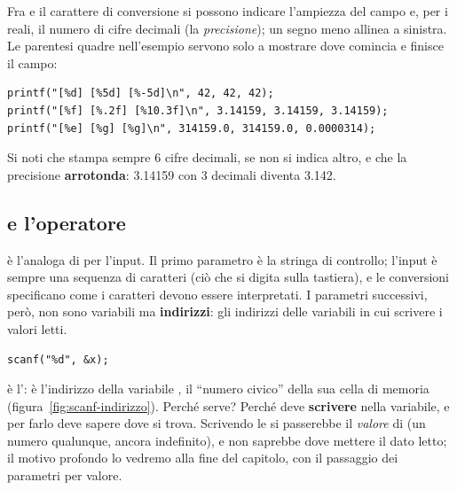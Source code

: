 Fra \code{\%} e il carattere di conversione si possono indicare l'ampiezza
del campo e, per i reali, il numero di cifre decimali (la
\textit{precisione}); un segno meno allinea a sinistra. Le parentesi quadre
nell'esempio servono solo a mostrare dove comincia e finisce il campo:

\begin{affianco}[0.55][c]
\begin{lstlisting}[style=c]
printf("[%d] [%5d] [%-5d]\n", 42, 42, 42);
printf("[%f] [%.2f] [%10.3f]\n", 3.14159, 3.14159, 3.14159);
printf("[%e] [%g] [%g]\n", 314159.0, 314159.0, 0.0000314);
\end{lstlisting}
\risultato
\begin{console}[Terminale]
[42] [   42] [42   ]
[3.141590] [3.14] [     3.142]
[3.141590e+05] [314159] [3.14e-05]
\end{console}
\end{affianco}

Si noti che  stampa sempre 6 cifre decimali, se non si indica
altro, e che la precisione \textbf{arrotonda}: 3.14159 con 3 decimali
diventa 3.142.

\subsection{ e l'operatore \code{\&}}

 è l'analoga di  per l'input. Il primo parametro è
la stringa di controllo; l'input è sempre una sequenza di caratteri (ciò che
si digita sulla tastiera), e le conversioni specificano come i caratteri
devono essere interpretati. I parametri successivi, però, non sono variabili
ma \textbf{indirizzi}: gli indirizzi delle variabili in cui scrivere i
valori letti.

\begin{lstlisting}[style=c]
scanf("%d", &x);
\end{lstlisting}

\code{\&} è l':  è l'indirizzo della
variabile , il “numero civico” della sua cella di memoria
(figura~\ref{fig:scanf-indirizzo}). Perché serve? Perché  deve
\textbf{scrivere} nella variabile, e per farlo deve sapere dove si trova.
Scrivendo  le si passerebbe il \textit{valore} di
 (un numero qualunque, ancora indefinito), e  non
saprebbe dove mettere il dato letto; il motivo profondo lo vedremo alla
fine del capitolo, con il passaggio dei parametri per valore.

